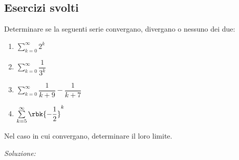 \documentclass[a4paper, 12pt]{report}
\begin{document}
    \newpage
    
    \subsection{Esercizi svolti}

    \begin{framedprob}{}
        Determinare se la seguenti serie convergano, divergano o nessuno dei due:
        \begin{enumerate}
            \item $\sum\limits_{k = 0}^{\infty} 2^k$
            \item $\sum\limits_{k = 0}^{\infty} \dfrac{1}{3^k}$
            \item $\sum\limits_{k = 0}^{\infty} \dfrac{1}{k+9} - \dfrac{1}{k+7}$
            \item $\sum\limits_{k = 5}^{\infty} \rbk{-\dfrac{1}{2}}^k$
        \end{enumerate}
        Nel caso in cui convergano, determinare il loro limite.
    \end{framedprob}

    \textit{Soluzione:}
\end{document}
